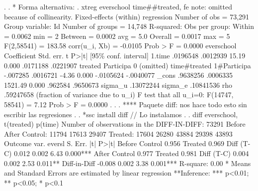 {\smallskip}
. 
. * Forma alternativa:
. xtreg everschool time\#\#treated, fe 
note: {} omitted because of collinearity.
{\smallskip}
Fixed-effects (within) regression               Number of obs     =     73,291
Group variable: Id                              Number of groups  =     14,748
{\smallskip}
R-squared:                                      Obs per group:
     Within  = 0.0062                                         min =          2
     Between = 0.0002                                         avg =        5.0
     Overall = 0.0017                                         max =          5
{\smallskip}
                                                F(2,58541)        =     183.58
corr(u_i, Xb) = -0.0105                         Prob > F          =     0.0000
{\smallskip}
  everschool {\VBAR} Coefficient  Std. err.      t    P>|t|     [95\% conf. interval]
      1.time {\VBAR}   .0196548   .0012939    15.19   0.000     .0171188    .0221907
             {\VBAR}
     treated {\VBAR}
  Participa  {\VBAR}          0  (omitted)
             {\VBAR}
time\#treated {\VBAR}
1\#Participa  {\VBAR}   -.007285   .0016721    -4.36   0.000    -.0105624   -.0040077
             {\VBAR}
       _cons {\VBAR}   .9638256   .0006335  1521.49   0.000      .962584    .9650673
     sigma_u {\VBAR}  .13072244
     sigma_e {\VBAR}  .10841536
         rho {\VBAR}  .59247658   (fraction of variance due to u_i)
F test that all u_i=0: F(14747, 58541) = 7.12                Prob > F = 0.0000
{\smallskip}
. 
. 
. **** Paquete diff: nos hace todo esto sin escribir las regresiones
. 
. *ssc install diff // Lo instalamos 
. 
. diff everschool, t(treated) p(time)
{\smallskip}
{}
Number of observations in the DIFF-IN-DIFF: 73291
            Before         After    
   Control: 11794          17613       29407
   Treated: 17604          26280       43884
            29398          43893
 Outcome var.   {\VBAR} evers{\tytilde}l {\VBAR} S. Err. {\VBAR}   |t|   {\VBAR}  P>|t|
Before          {\VBAR}         {\VBAR}         {\VBAR}         {\VBAR} 
   Control      {\VBAR} 0.956   {\VBAR}         {\VBAR}         {\VBAR} 
   Treated      {\VBAR} 0.969   {\VBAR}         {\VBAR}         {\VBAR} 
   Diff (T-C)   {\VBAR} 0.012   {\VBAR} 0.002   {\VBAR} 6.43    {\VBAR} 0.000***
After           {\VBAR}         {\VBAR}         {\VBAR}         {\VBAR} 
   Control      {\VBAR} 0.977   {\VBAR}         {\VBAR}         {\VBAR} 
   Treated      {\VBAR} 0.981   {\VBAR}         {\VBAR}         {\VBAR} 
   Diff (T-C)   {\VBAR} 0.004   {\VBAR} 0.002   {\VBAR} 2.53    {\VBAR} 0.011**
                {\VBAR}         {\VBAR}         {\VBAR}         {\VBAR} 
Diff-in-Diff    {\VBAR} -0.008  {\VBAR} 0.002   {\VBAR} 3.38    {\VBAR} 0.001***
R-square:    0.00
* Means and Standard Errors are estimated by linear regression
**Inference: *** p<0.01; ** p<0.05; * p<0.1
{\smallskip}
